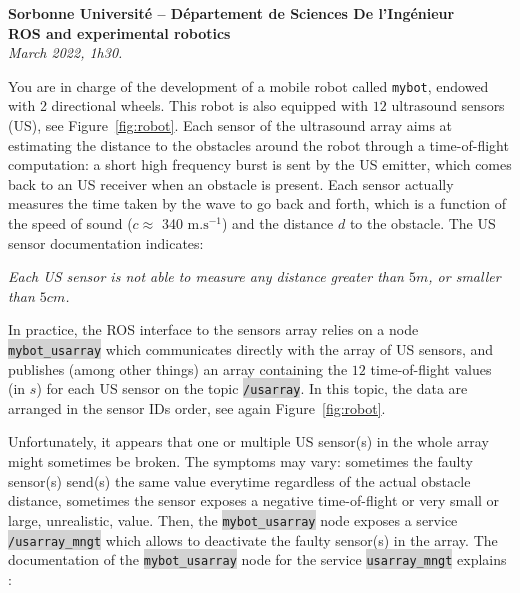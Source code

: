 \documentclass[10pt,a4paper,english]{exam}
\newcommand{\mytext}[1]{\colorbox{lightgray}{\texttt{#1}}}
\begin{document}
{\large
\begin{center}
	{
		\textbf{Sorbonne Université -- Département de Sciences De l'Ingénieur\\}
		\textbf{ROS and experimental robotics}}\\
	\emph{March 2022, 1h30. \\
	}
\end{center}}

You are in charge of the development of a mobile robot called \texttt{mybot}, endowed with 2
directional wheels. This robot is also equipped with $12$ ultrasound sensors (US), see
Figure~\ref{fig:robot}. Each sensor of the ultrasound array aims at estimating the distance to the
obstacles around the robot through a time-of-flight computation: a short high frequency burst is
sent by the US emitter, which comes back to an US receiver when an obstacle is present. Each sensor
actually measures the time taken by the wave to go back and forth, which is a function of the speed
of sound ($c \approx$ 340 $\text{m.s}^{-1}$) and the distance $d$ to the obstacle. The US sensor
documentation indicates:
%
\begin{tcolorbox}
	\textit{Each US sensor is not able to measure any distance greater than $5m$, or smaller than $5cm$.}
\end{tcolorbox}

In practice, the ROS interface to the sensors array relies on a node
\mytext{mybot\_usarray} which communicates directly with the array of US sensors, and publishes
(among other things) an array containing the $12$ time-of-flight values (in $s$) for each US sensor
on the topic \mytext{/usarray}. In this topic, the data are arranged in the sensor IDs order, see
again Figure~\ref{fig:robot}.

Unfortunately, it appears that one or multiple US sensor(s) in the whole array might sometimes be
broken. The symptoms may vary:  sometimes the faulty sensor(s) send(s) the same value everytime
regardless of the actual obstacle distance, sometimes the sensor exposes a negative time-of-flight
or very small or large, unrealistic, value. Then, the \mytext{mybot\_usarray} node exposes a service
\mytext{/usarray\_mngt} which allows to deactivate the faulty sensor(s) in the array. The
documentation of the \mytext{mybot\_usarray} node for the service \mytext{usarray\_mngt} explains :
\end{document}
